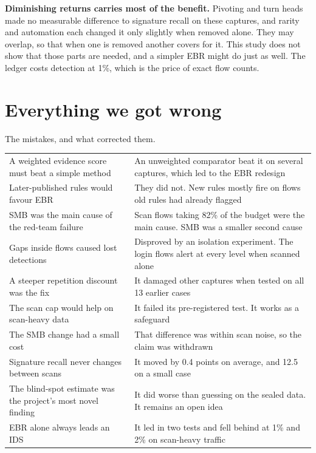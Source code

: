 \begin{honest}
\textbf{Diminishing returns carries most of the benefit.} Pivoting and turn heads made no measurable difference to signature recall on these captures, and rarity and automation each changed it only slightly when removed alone. They may overlap, so that when one is removed another covers for it. This study does not show that those parts are needed, and a simpler EBR might do just as well. The ledger costs detection at 1\%, which is the price of exact flow counts.
\end{honest}

\chapter{Everything we got wrong}
\label{ch:wrong}

\begin{gtable}{The mistakes, and what corrected them.}
\begin{tabularx}{\linewidth}{L L}
\toprule
{} & \\
\midrule
A weighted evidence score must beat a simple method & An unweighted comparator beat it on several captures, which led to the EBR redesign\\
Later-published rules would favour EBR & They did not. New rules mostly fire on flows old rules had already flagged\\
SMB was the main cause of the red-team failure & Scan flows taking 82\% of the budget were the main cause. SMB was a smaller second cause\\
Gaps inside flows caused lost detections & Disproved by an isolation experiment. The login flows alert at every level when scanned alone\\
A steeper repetition discount was the fix & It damaged other captures when tested on all 13 earlier cases\\
The scan cap would help on scan-heavy data & It failed its pre-registered test. It works as a safeguard\\
The SMB change had a small cost & That difference was within scan noise, so the claim was withdrawn\\
Signature recall never changes between scans & It moved by 0.4 points on average, and 12.5 on a small case\\
The blind-spot estimate was the project's most novel finding & It did worse than guessing on the sealed data. It remains an open idea\\
EBR alone always leads an IDS & It led in two tests and fell behind at 1\% and 2\% on scan-heavy traffic\\
\bottomrule
\end{tabularx}
\end{gtable}

